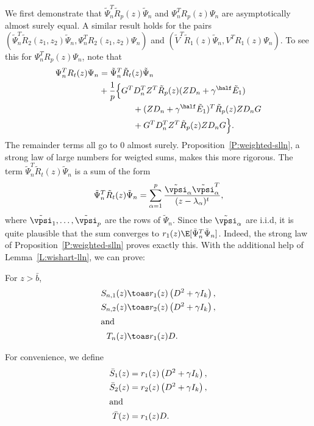 We first demonstrate that $\tilde \Psi_n^T \tilde R_p(z) \tilde \Psi_n$ and 
$\Psi_n^T R_p (z) \Psi_n$ are asymptotically almost surely
equal. A similar result holds for the pairs 
$(\tilde \Psi_n^T \tilde R_2(z_1, z_2) \tilde \Psi_n,
  \Psi_n^T R_2(z_1, z_2) \Psi_n)$
and $(\tilde V^T \tilde R_1(z) \tilde \Psi_n, V^T R_1(z) \Psi_n)$.
To see this for $\Psi_n^T R_p(z) \Psi_n$, note that
\begin{align*}
    \begin{split}
    \Psi_n^T R_t (z) \Psi_n
    &=
    \tilde \Psi_n^T \tilde R_t(z) \tilde \Psi_n \\
        &+ \frac{1}{p} \Big\{
        G^T D_n^T Z^T \tilde R_p(z) ( Z D_n + \gamma^\half \tilde E_1) \\
        &\qquad \qquad +
        ( Z D_n + \gamma^\half \tilde E_1)^T \tilde R_p(z) Z D_n G \\
        &\qquad \qquad +
        G^T D_n^T Z^T \tilde R_p(z) Z D_n G
        \Big\}.
    \end{split}
\end{align*}
The remainder terms all go to $0$ almost surely.
Proposition~\ref{P:weighted-slln}, a strong law of large numbers for weigted sums,
makes this more rigorous.  The term 
$\tilde \Psi_n^T \tilde R_t(z) \tilde \Psi_n$ is a sum of the form
\[
    \tilde \Psi_n^T \tilde R_t(z) \tilde \Psi_n 
    =
    \sum_{\alpha=1}^p
        \frac{\tilde \vpsi_\alpha \tilde \vpsi^T_\alpha }
             {(z - \lambda_\alpha)^t},
\]
where $\tilde \vpsi_1, \ldots, \tilde \vpsi_p$ are the rows of $\tilde \Psi_n$.
Since the $\tilde \vpsi_\alpha$ are i.i.d, it is quite plausible that the sum
converges to $r_1(z) \E[ \tilde \Psi_n^T \tilde \Psi_n ]$.  Indeed, the strong
law of Proposition~\ref{P:weighted-slln} proves exactly this.  With the additional
help of Lemma~\ref{L:wishart-lln}, we can prove:

\begin{lemma}\label{L:Sbar}
    For $z > \bar b$, 
    \begin{align*}
        S_{n,1}(z) &\toas r_1(z) \left( D^2 + \gamma I_k \right), \\
        S_{n,2}(z) &\toas r_2(z) \left( D^2 + \gamma I_k \right), \\
    \intertext{and}
        T_n(z) &\toas r_1(z) D.
    \end{align*}
\end{lemma}

For convenience, we define
\begin{align*}
    \bar S_1(z) &= r_1(z) \left( D^2 + \gamma I_k \right), \\
    \bar S_2(z) &= r_2(z) \left( D^2 + \gamma I_k \right), \\
\intertext{and}
    \bar T(z) &= r_1(z) D.
\end{align*}


